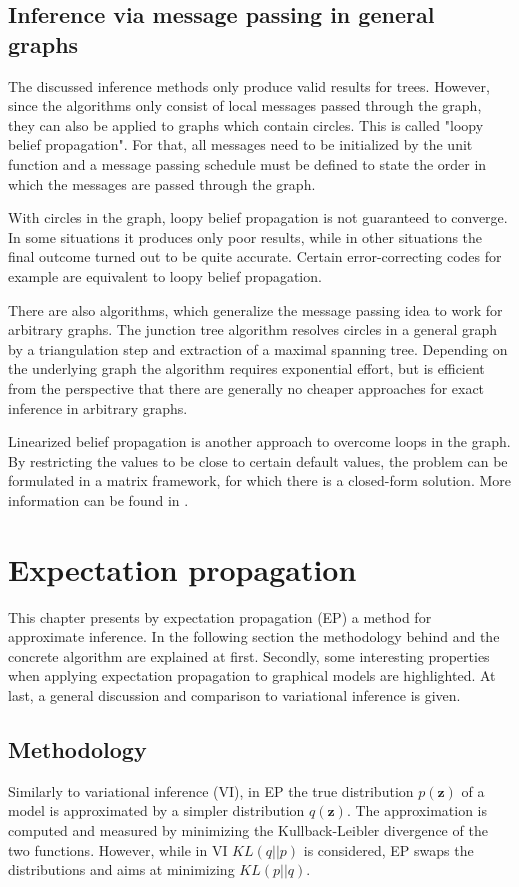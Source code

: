 \documentclass{sigkdd}
\begin{document}
\subsection{Inference via message passing in general graphs}
The discussed inference methods only produce valid results for trees. However, since the algorithms only consist of local messages passed through the graph, they can also be applied to graphs which contain circles. This is called "loopy belief propagation". For that, all messages need to be initialized by the unit function and a message passing schedule must be defined to state the order in which the messages are passed through the graph.

With circles in the graph, loopy belief propagation is not guaranteed to converge. In some situations it produces only poor results, while in other situations the final outcome turned out to be quite accurate. Certain error-correcting codes for example are equivalent to loopy belief propagation.

There are also algorithms, which generalize the message passing idea to work for arbitrary graphs. The junction tree algorithm resolves circles in a general graph by a triangulation step and extraction of a maximal spanning tree. Depending on the underlying graph the algorithm requires exponential effort, but is efficient from the perspective that there are generally no cheaper approaches for exact inference in arbitrary graphs.

Linearized belief propagation is another approach to overcome loops in the graph. By restricting the values to be close to certain default values, the problem can be formulated in a matrix framework, for which there is a closed-form solution. More information can be found in \cite{Gatterbauer:2015:LSB:2735479.2735490}. 

\section{Expectation propagation}\label{chapter:approximate_inference}
This chapter presents by expectation propagation (EP) a method for approximate inference. In the following section the methodology behind and the concrete algorithm are explained at first. Secondly, some interesting properties when applying expectation propagation to graphical models are highlighted. At last, a general discussion and comparison to variational inference is given.

\subsection{Methodology}
Similarly to variational inference (VI), in EP the true distribution $p(\mathbf{z})$ of a model is approximated by a simpler distribution $q(\mathbf{z})$. The approximation is computed and measured by minimizing the Kullback-Leibler divergence of the two functions. However, while in VI $KL(q||p)$ is considered, EP swaps the distributions and aims at minimizing $KL(p||q)$.
\end{document}
